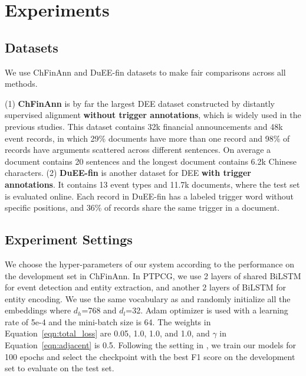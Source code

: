 \section{Experiments}
\subsection{Datasets}

We use ChFinAnn \cite{zheng-etal-2019-doc2edag} and DuEE-fin \cite{duee-fin} datasets to make fair comparisons across all methods.

\noindent (1) \textbf{ChFinAnn} is by far the largest DEE dataset constructed by distantly supervised alignment \textbf{without trigger annotations}, which is widely used in the previous studies.
This dataset contains 32k financial announcements and 48k event records, in which 29\% documents have more than one record and 98\% of records have arguments scattered across different sentences.
On average a document contains 20 sentences and the longest document contains 6.2k Chinese characters.
(2) \textbf{DuEE-fin} is another dataset for DEE \textbf{with trigger annotations}.
It contains 13 event types and 11.7k documents, where the test set is evaluated online.
Each record in DuEE-fin has a labeled trigger word without specific positions, and 36\% of records share the same trigger in a document.

\subsection{Experiment Settings}
We choose the hyper-parameters of our system according to the performance on the development set in ChFinAnn.
In PTPCG, we use 2 layers of shared BiLSTM for event detection and entity extraction, and another 2 layers of BiLSTM for entity encoding.
We use the same vocabulary as \cite{zheng-etal-2019-doc2edag} and randomly initialize all the embeddings where $d_h$=768 and $d_l$=32.
Adam \cite{adam} optimizer is used with a learning rate of 5e-4 and the mini-batch size is 64.
The weights in Equation~\ref{eqn:total_loss} are 0.05, 1.0, 1.0, and 1.0, and $\gamma$ in Equation~\ref{eqn:adjacent} is 0.5.
Following the setting in \citet{zheng-etal-2019-doc2edag}, we train our models for 100 epochs and select the checkpoint with the best F1 score on the development set to evaluate on the test set.

